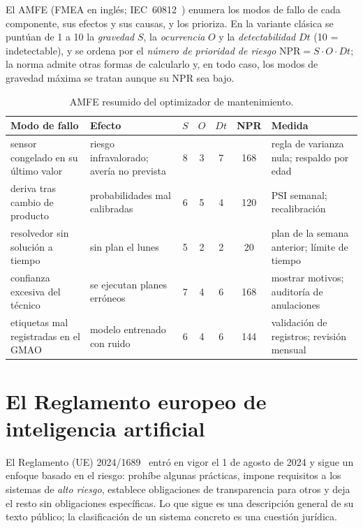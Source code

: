\begin{definicion}\label{def:amfe}
El AMFE (FMEA en inglés; IEC~60812~\cite{iec60812}) enumera los modos de fallo de cada componente, sus efectos y sus causas, y los prioriza. En la variante clásica se puntúan de 1 a 10 la \emph{gravedad} $S$, la \emph{ocurrencia} $O$ y la \emph{detectabilidad} $Dt$ (10 = indetectable), y se ordena por el \emph{número de prioridad de riesgo} $\mathrm{NPR}=S\cdot O\cdot Dt$; la norma admite otras formas de calcularlo y, en todo caso, los modos de gravedad máxima se tratan aunque su NPR sea bajo.
\end{definicion}

\begin{table}[h]
\centering\small
\caption{AMFE resumido del optimizador de mantenimiento.}\label{tab:amfe}
\setlength{\tabcolsep}{4pt}\footnotesize
\begin{tabularx}{\textwidth}{@{}>{\raggedright\arraybackslash}p{2.8cm}>{\raggedright\arraybackslash}X cccc >{\raggedright\arraybackslash}p{3.0cm}@{}}
\toprule
Modo de fallo & Efecto & $S$ & $O$ & $Dt$ & NPR & Medida \\
\midrule
sensor congelado en su último valor & riesgo infravalorado; avería no prevista & 8 & 3 & 7 & 168 & regla de varianza nula; respaldo por edad \\
deriva tras cambio de producto & probabilidades mal calibradas & 6 & 5 & 4 & 120 & PSI semanal; recalibración \\
resolvedor sin solución a tiempo & sin plan el lunes & 5 & 2 & 2 & 20 & plan de la semana anterior; límite de tiempo \\
confianza excesiva del técnico & se ejecutan planes erróneos & 7 & 4 & 6 & 168 & mostrar motivos; auditoría de anulaciones \\
etiquetas mal registradas en el GMAO & modelo entrenado con ruido & 6 & 4 & 6 & 144 & validación de registros; revisión mensual \\
\bottomrule
\end{tabularx}
\end{table}

\section{El Reglamento europeo de inteligencia artificial}

El Reglamento (UE) 2024/1689~\cite{aiact} entró en vigor el 1 de agosto de 2024 y sigue un enfoque basado en el riesgo: prohíbe algunas prácticas, impone requisitos a los sistemas de \emph{alto riesgo}, establece obligaciones de transparencia para otros y deja el resto sin obligaciones específicas. Lo que sigue es una descripción general de su texto público; la clasificación de un sistema concreto es una cuestión jurídica.

